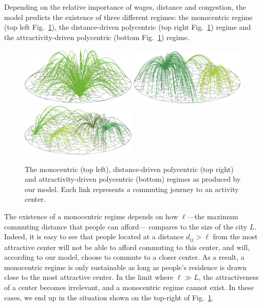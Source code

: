 Depending on the relative importance of wages, distance and congestion, the
model predicts the existence of three different regimes: the monocentric regime
(top left Fig.~\ref{fig:model_results}), the distance-driven polycentric (top
right Fig.~\ref{fig:model_results}) regime and the attractivity-driven
polycentric (bottom Fig.~\ref{fig:model_results}) regime. 


\begin{figure}
    \centering
    \includegraphics[width=0.49\textwidth]{gfx/chapter-monocentric/1.pdf}
    \includegraphics[width=0.49\textwidth]{gfx/chapter-monocentric/2.pdf}
    \includegraphics[width=0.49\textwidth]{gfx/chapter-monocentric/3.pdf}
    \caption{The monocentric (top left), distance-driven polycentric (top right)
      and attractivity-driven polycentric (bottom) regimes as produced by
      our model. Each link represents a commuting journey to an activity center. \label{fig:model_results}}
\end{figure}

The existence of a monocentric regime depends on how $\ell$---the maximum commuting distance that people can
afford--- compares to the size of the city $L$. Indeed, it is easy to
see that people located at a distance $d_{ij} > \ell$
from the most attractive center will not be able to afford commuting to this
center, and will, according to our model, choose to commute to a closer center.
As a result, a monocentric regime is only sustainable as long as people's
residence is drawn close to the most attractive center. In the limit where $\ell
\gg L$, the attractiveness of a center becomes irrelevant, and a monocentric regime cannot
exist. In these cases, we end up in the situation shown on the top-right of
Fig.~\ref{fig:model_results}.\\


